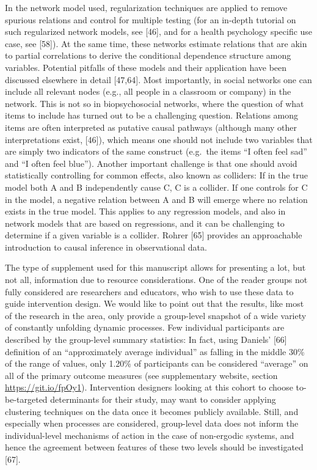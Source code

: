 \documentclass[english,man,floatsintext]{apa6}
\begin{document}
In the network model used, regularization techniques are applied to remove spurious relations and control for multiple testing (for an in-depth tutorial on such regularized network models, see {[}46{]}, and for a health psychology specific use case, see {[}58{]}). At the same time, these networks estimate relations that are akin to partial correlations to derive the conditional dependence structure among variables. Potential pitfalls of these models and their application have been discussed elsewhere in detail {[}47,64{]}. Most importantly, in social networks one can include all relevant nodes (e.g., all people in a classroom or company) in the network. This is not so in biopsychosocial networks, where the question of what items to include has turned out to be a challenging question. Relations among items are often interpreted as putative causal pathways (although many other interpretations exist, {[}46{]}), which means one should not include two variables that are simply two indicators of the same construct (e.g.~the items \enquote{I often feel sad} and \enquote{I often feel blue}). Another important challenge is that one should avoid statistically controlling for common effects, also known as colliders: If in the true model both A and B independently cause C, C is a collider. If one controls for C in the model, a negative relation between A and B will emerge where no relation exists in the true model. This applies to any regression models, and also in network models that are based on regressions, and it can be challenging to determine if a given variable is a collider. Rohrer {[}65{]} provides an approachable introduction to causal inference in observational data.

The type of supplement used for this manuscript allows for presenting a lot, but not all, information due to resource considerations. One of the reader groups not fully considered are researchers and educators, who wish to use these data to guide intervention design. We would like to point out that the results, like most of the research in the area, only provide a group-level snapshot of a wide variety of constantly unfolding dynamic processes. Few individual participants are described by the group-level summary statistics: In fact, using Daniels' {[}66{]} definition of an \enquote{approximately average individual} as falling in the middle 30\% of the range of values, only 1.20\% of participants can be considered \enquote{average} on all of the primary outcome measures (see supplementary website, section \url{https://git.io/fpOy1}). Intervention designers looking at this cohort to choose to-be-targeted determinants for their study, may want to consider applying clustering techniques on the data once it becomes publicly available. Still, and especially when processes are considered, group-level data does not inform the individual-level mechanisms of action in the case of non-ergodic systems, and hence the agreement between features of these two levels should be investigated {[}67{]}.
\end{document}
